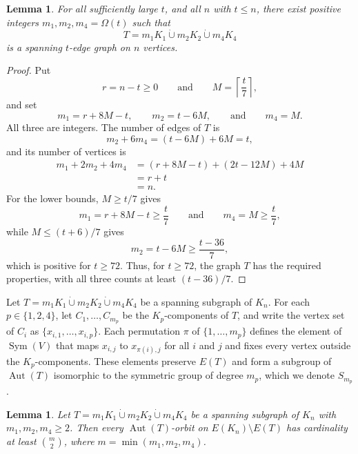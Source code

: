 \documentclass[12pt]{amsart}
\newtheorem{lemma}[theorem]{Lemma}
\theoremstyle{definition}
\DeclareMathOperator{\Sym}{Sym}
\DeclareMathOperator{\Aut}{Aut}
\newcommand{\dcup}{\mathbin{\dot\cup}}
\begin{document}
\begin{lemma}
\label{lem:testgraph}
For all sufficiently large $t$, and all $n$ with $t \leq n$, there exist
positive integers $m_1, m_2, m_4 = \Omega(t)$ such that
\[
T = m_1 K_1 \dcup m_2 K_2 \dcup m_4 K_4
\]
is a spanning $t$-edge graph on $n$ vertices.
\end{lemma}

\begin{proof}
Put
\[
r = n - t \geq 0
\qquad \text{and} \qquad
M = \left\lceil \frac{t}{7} \right\rceil,
\]
and set
\[
m_1 = r + 8M - t, \qquad m_2 = t - 6M, \qquad \text{and} \qquad m_4 = M.
\]
All three are integers. The number of edges of $T$ is
\[
m_2 + 6m_4 = (t - 6M) + 6M = t,
\]
and its number of vertices is
\begin{align*}
m_1 + 2m_2 + 4m_4 &= (r + 8M - t) + (2t - 12M) + 4M \\
&= r + t \\
&= n.
\end{align*}
For the lower bounds, $M \geq t/7$ gives
\[
m_1 = r + 8M - t \geq \frac{t}{7}
\qquad \text{and} \qquad
m_4 = M \geq \frac{t}{7},
\]
while $M \leq (t + 6)/7$ gives
\[
m_2 = t - 6M \geq \frac{t - 36}{7},
\]
which is positive for $t \geq 72$. Thus, for $t \geq 72$, the graph $T$ has
the required properties, with all three counts at least $(t - 36)/7$.
\end{proof}

Let $T = m_1 K_1 \dcup m_2 K_2 \dcup m_4 K_4$ be a spanning subgraph of
$K_n$. For each $p \in \{1, 2, 4\}$, let $C_1, \ldots, C_{m_p}$ be the
$K_p$-components of $T$, and write the vertex set of $C_i$ as $\{x_{i,1},
\ldots, x_{i,p}\}$. Each permutation $\pi$ of $\{1, \ldots, m_p\}$ defines
the element of $\Sym(V)$ that maps $x_{i,j}$ to $x_{\pi(i),j}$ for all $i$
and $j$ and fixes every vertex outside the $K_p$-components. These elements
preserve $E(T)$ and form a subgroup of $\Aut(T)$ isomorphic to the symmetric
group of degree $m_p$, which we denote $S_{m_p}$.

\begin{lemma}
\label{lem:orbitbound}
Let $T = m_1 K_1 \dcup m_2 K_2 \dcup m_4 K_4$ be a spanning subgraph of
$K_n$ with $m_1, m_2, m_4 \geq 2$. Then every $\Aut(T)$-orbit on $E(K_n)
\setminus E(T)$ has cardinality at least $\binom{m}{2}$, where $m =
\min(m_1, m_2, m_4)$.
\end{lemma}
\end{document}
